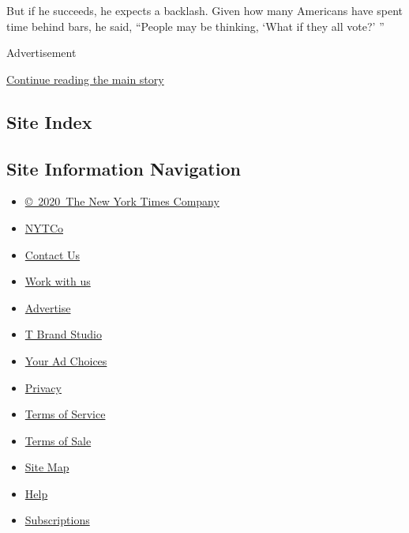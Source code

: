 But if he succeeds, he expects a backlash. Given how many Americans have
spent time behind bars, he said, ``People may be thinking, `What if they
all vote?' ''

Advertisement

\protect\hyperlink{after-bottom}{Continue reading the main story}

\hypertarget{site-index}{%
\subsection{Site Index}\label{site-index}}

\hypertarget{site-information-navigation}{%
\subsection{Site Information
Navigation}\label{site-information-navigation}}

\begin{itemize}
\tightlist
\item
  \href{https://help.nytimes3xbfgragh.onion/hc/en-us/articles/115014792127-Copyright-notice}{©~2020~The
  New York Times Company}
\end{itemize}

\begin{itemize}
\tightlist
\item
  \href{https://www.nytco.com/}{NYTCo}
\item
  \href{https://help.nytimes3xbfgragh.onion/hc/en-us/articles/115015385887-Contact-Us}{Contact
  Us}
\item
  \href{https://www.nytco.com/careers/}{Work with us}
\item
  \href{https://nytmediakit.com/}{Advertise}
\item
  \href{http://www.tbrandstudio.com/}{T Brand Studio}
\item
  \href{https://www.nytimes3xbfgragh.onion/privacy/cookie-policy\#how-do-i-manage-trackers}{Your
  Ad Choices}
\item
  \href{https://www.nytimes3xbfgragh.onion/privacy}{Privacy}
\item
  \href{https://help.nytimes3xbfgragh.onion/hc/en-us/articles/115014893428-Terms-of-service}{Terms
  of Service}
\item
  \href{https://help.nytimes3xbfgragh.onion/hc/en-us/articles/115014893968-Terms-of-sale}{Terms
  of Sale}
\item
  \href{https://spiderbites.nytimes3xbfgragh.onion}{Site Map}
\item
  \href{https://help.nytimes3xbfgragh.onion/hc/en-us}{Help}
\item
  \href{https://www.nytimes3xbfgragh.onion/subscription?campaignId=37WXW}{Subscriptions}
\end{itemize}
